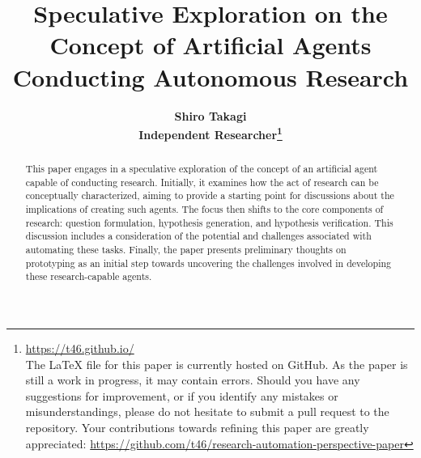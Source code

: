 \documentclass{article}
\title{\bfseries Speculative Exploration on the Concept of Artificial Agents Conducting Autonomous Research}
\author{\normalsize \bfseries Shiro Takagi \\
\normalsize Independent Researcher\footnote{\href{https://t46.github.io/}{https://t46.github.io/} \\
The LaTeX file for this paper is currently hosted on GitHub. As the paper is still a work in progress, it may contain errors. Should you have any suggestions for improvement, or if you identify any mistakes or misunderstandings, please do not hesitate to submit a pull request to the repository. Your contributions towards refining this paper are greatly appreciated: \href{https://github.com/t46/research-automation-perspective-paper}{https://github.com/t46/research-automation-perspective-paper} }}
\date{}
\begin{document}
\sloppy
\maketitle


\begin{abstract}
This paper engages in a speculative exploration of the concept of an artificial agent capable of conducting research. Initially, it examines how the act of research can be conceptually characterized, aiming to provide a starting point for discussions about the implications of creating such agents. The focus then shifts to the core components of research: question formulation, hypothesis generation, and hypothesis verification. This discussion includes a consideration of the potential and challenges associated with automating these tasks. Finally, the paper presents preliminary thoughts on prototyping as an initial step towards uncovering the challenges involved in developing these research-capable agents.
\end{abstract}

\tableofcontents




% 
% 
% 



% 


\appendix

\end{document}
